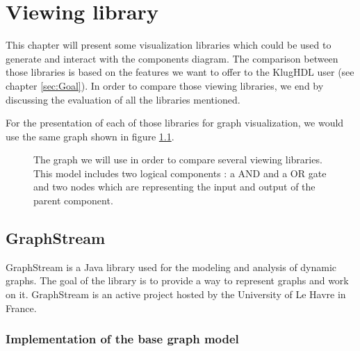 \chapter{Viewing library}
\label{cha:Viewing library}

This chapter will present some visualization libraries which could be used to
generate and interact with the components diagram. The comparison between those
libraries is based on the features we want to offer to the KlugHDL user (see
chapter \ref{sec:Goal}). In order to compare those viewing libraries, we end by
discussing the evaluation of all the libraries mentioned.

For the presentation of each of those libraries for graph visualization, we would
use the same graph shown in figure \ref{fig:graph-base-model}.

\begin{figure}[H]
  \centering
  \caption[Graph model for the viewing library comparison]{The graph we will use
    in order to compare several viewing libraries. This model includes two
    logical components : a AND and a OR gate and two nodes which are
    representing the input and output of the parent component.}
  \label{fig:graph-base-model}
\end{figure}

\section{GraphStream}
\label{sec:GraphStream}

GraphStream is a Java library used for the modeling and analysis of dynamic
graphs\cite{graphstream}. The goal of the library is to provide a way to
represent graphs and work on it\cite{graphstream}. GraphStream is an active
project hosted by the University of Le Havre in France.

\subsection{Implementation of the base graph model}
\label{sub:Implementation}

